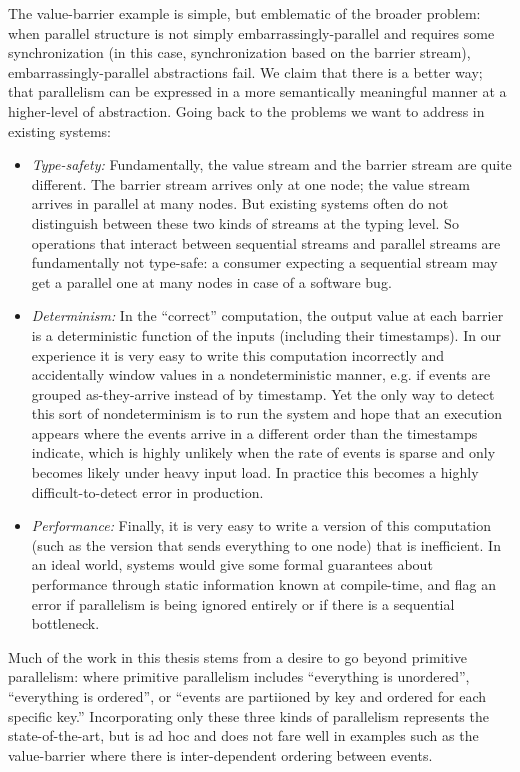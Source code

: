 The value-barrier example is simple, but emblematic of the broader problem: when parallel structure is not simply embarrassingly-parallel and requires some synchronization (in this case, synchronization based on the barrier stream), embarrassingly-parallel abstractions fail.
We claim that there is a better way; that parallelism can be expressed in a more semantically meaningful manner at a higher-level of abstraction.
Going back to the problems we want to address in existing systems:
\begin{itemize}
  \item \emph{Type-safety:} Fundamentally, the value stream and the barrier stream are quite different. The barrier stream arrives only at one node; the value stream arrives in parallel at many nodes. But existing systems often do not distinguish between these two kinds of streams at the typing level. So operations that interact between sequential streams and parallel streams are fundamentally not type-safe: a consumer expecting a sequential stream may get a parallel one at many nodes in case of a software bug.
  \item \emph{Determinism:} In the ``correct'' computation, the output value at each barrier is a deterministic function of the inputs (including their timestamps). In our experience it is very easy to write this computation incorrectly and accidentally window values in a nondeterministic manner, e.g. if events are grouped as-they-arrive instead of by timestamp. Yet the only way to detect this sort of nondeterminism is to run the system and hope that an execution appears where the events arrive in a different order than the timestamps indicate, which is highly unlikely when the rate of events is sparse and only becomes likely under heavy input load. In practice this becomes a highly difficult-to-detect error in production.
  \item \emph{Performance:} Finally, it is very easy to write a version of this computation (such as the \naive{} version that sends everything to one node) that is inefficient. In an ideal world, systems would give some formal guarantees about performance through static information known at compile-time, and flag an error if parallelism is being ignored entirely or if there is a sequential bottleneck.
\end{itemize}

Much of the work in this thesis stems from a desire to go beyond primitive parallelism: where primitive parallelism includes ``everything is unordered'', ``everything is ordered'', or ``events are partiioned by key and ordered for each specific key.'' Incorporating only these three kinds of parallelism represents the state-of-the-art, but is ad hoc and does not fare well in examples such as the value-barrier where there is inter-dependent ordering between events.

